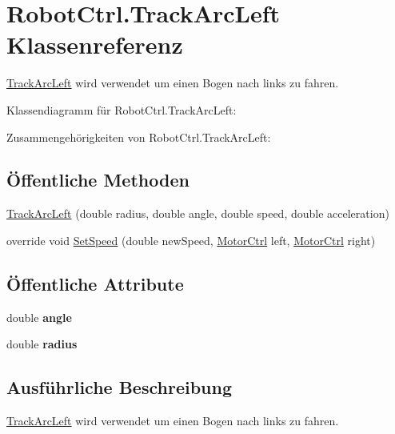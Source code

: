 \hypertarget{class_robot_ctrl_1_1_track_arc_left}{
\section{RobotCtrl.TrackArcLeft Klassenreferenz}
\label{class_robot_ctrl_1_1_track_arc_left}
}


\hyperlink{class_robot_ctrl_1_1_track_arc_left}{TrackArcLeft} wird verwendet um einen Bogen nach links zu fahren.  




Klassendiagramm für RobotCtrl.TrackArcLeft:

Zusammengehörigkeiten von RobotCtrl.TrackArcLeft:\subsection*{Öffentliche Methoden}
\begin{DoxyCompactItemize}
\item 
\hyperlink{class_robot_ctrl_1_1_track_arc_left_a405f8fa89cf86603b3696a282d05dcff}{TrackArcLeft} (double radius, double angle, double speed, double acceleration)
\item 
override void \hyperlink{class_robot_ctrl_1_1_track_arc_left_aee8e8c1da176807436c2946e39bbd6ae}{SetSpeed} (double newSpeed, \hyperlink{class_robot_ctrl_1_1_motor_ctrl}{MotorCtrl} left, \hyperlink{class_robot_ctrl_1_1_motor_ctrl}{MotorCtrl} right)
\end{DoxyCompactItemize}
\subsection*{Öffentliche Attribute}
\begin{DoxyCompactItemize}
\item 
\hypertarget{class_robot_ctrl_1_1_track_arc_left_a3d6fadeb6e8d2967178696601569b3d5}{
double {\bfseries angle}}
\label{class_robot_ctrl_1_1_track_arc_left_a3d6fadeb6e8d2967178696601569b3d5}

\item 
\hypertarget{class_robot_ctrl_1_1_track_arc_left_a74198f81576aa2160802c31d1b37c9c8}{
double {\bfseries radius}}
\label{class_robot_ctrl_1_1_track_arc_left_a74198f81576aa2160802c31d1b37c9c8}

\end{DoxyCompactItemize}


\subsection{Ausführliche Beschreibung}
\hyperlink{class_robot_ctrl_1_1_track_arc_left}{TrackArcLeft} wird verwendet um einen Bogen nach links zu fahren. 

